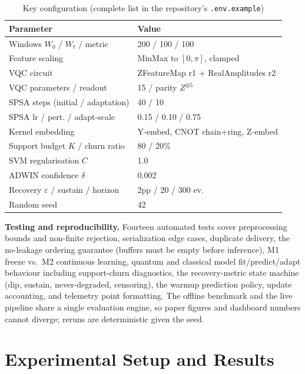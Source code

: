 \documentclass[conference]{IEEEtran}
\begin{document}
\begin{table}[t]
\centering
\caption{Key configuration (complete list in the repository's \texttt{.env.example})}
\label{tab:config}
\footnotesize
\setlength{\tabcolsep}{3pt}
\begin{tabular}{@{}ll@{}}
\toprule
Parameter & Value \\
\midrule
Windows $W_0$ / $W_t$ / metric & 200 / 100 / 100 \\
Feature scaling & MinMax to $[0,\pi]$, clamped \\
VQC circuit & ZFeatureMap r1 + RealAmplitudes r2 \\
VQC parameters / readout & 15 / parity $Z^{\otimes 5}$ \\
SPSA steps (initial / adaptation) & 40 / 10 \\
SPSA lr / pert. / adapt-scale & 0.15 / 0.10 / 0.75 \\
Kernel embedding & Y-embed, CNOT chain+ring, Z-embed \\
Support budget $K$ / churn ratio & 80 / 20\% \\
SVM regularisation $C$ & 1.0 \\
ADWIN confidence $\delta$ & 0.002 \\
Recovery $\varepsilon$ / sustain / horizon & 2pp / 20 / 300 ev. \\
Random seed & 42 \\
\bottomrule
\end{tabular}
\end{table}

\textbf{Testing and reproducibility.} Fourteen automated tests cover preprocessing bounds
and non-finite rejection, serialization edge cases, duplicate delivery, the no-leakage
ordering guarantee (buffers must be empty before inference), M1 freeze vs.\ M2 continuous
learning, quantum and classical model fit/predict/adapt behaviour including support-churn
diagnostics, the recovery-metric state machine (dip, sustain, never-degraded, censoring),
the warmup prediction policy, update accounting, and telemetry point formatting. The
offline benchmark and the live pipeline share a single evaluation engine, so paper figures
and dashboard numbers cannot diverge; reruns are deterministic given the seed.

\section{Experimental Setup and Results}
\label{sec:results}
\end{document}
